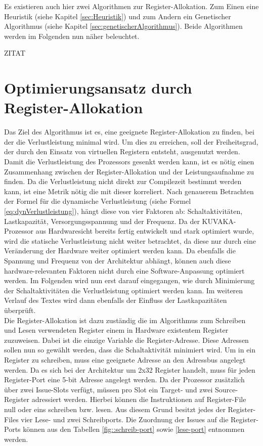 \begin{itemize}
		Es existieren auch hier zwei Algorithmen zur Register-Allokation. Zum Einen eine Heuristik (siehe Kapitel \ref{sec:Heuristik}) und zum Andern ein Genetischer Algorithmus (siehe Kapitel \ref{sec:genetischerAlgorithmus}). Beide Algorithmen werden im Folgenden nun näher beleuchtet.
\end{itemize} ZITAT


\section{Optimierungsansatz durch Register-Allokation}
\label{chap:ansatz}
Das Ziel des Algorithmus ist es, eine geeignete Register-Allokation zu finden, bei der die Verlustleistung minimal wird. Um dies zu erreichen, soll der Freiheitsgrad, der durch den Einsatz von virtuellen Registern entsteht, ausgenutzt werden.
Damit die Verlustleistung des Prozessors gesenkt werden kann, ist es nötig einen Zusammenhang zwischen der Register-Allokation und der Leistungsaufnahme zu finden. Da die Verlustleistung nicht direkt zur Compilezeit bestimmt werden kann, ist eine Metrik nötig die mit dieser korreliert.
Nach genauerem Betrachten der Formel für die dynamische Verlustleistung (siehe Formel \ref{eq:dynVerlustleistung}), hängt diese von vier Faktoren ab: Schaltaktivitäten,  Lastkapazität, Versorgungsspannung und der Frequenz. Da der KUVAKA-Prozessor aus Hardwaresicht bereits fertig entwickelt und stark optimiert wurde, wird die statische Verlustleistung nicht weiter betrachtet, da diese  nur durch eine Veränderung der Hardware weiter optimiert werden kann. Da ebenfalls  die Spannung und Frequenz von der Architektur abhängt, können auch diese hardware-relevanten Faktoren nicht durch eine Software-Anpassung optimiert werden. Im Folgenden wird nun erst darauf eingegangen, wie durch Minimierung der Schaltaktivitäten die Verlustleistung optimiert werden kann. Im weiteren Verlauf des Textes wird dann ebenfalls der Einfluss der Lastkapazitäten überprüft.\\
Die Register-Allokation ist dazu zuständig die im Algorithmus zum Schreiben und Lesen verwendeten Register einem in Hardware existentem Register zuzuweisen. Dabei ist die einzige Variable die Register-Adresse. Diese Adressen sollen nun so gewählt werden, dass die Schaltaktivität minimiert wird.
Um in ein Register zu schreiben, muss eine geeignete Adresse an den Adressbus angelegt werden. Da es sich bei der Architektur um 2x32 Register handelt, muss für jeden Register-Port eine 5-bit Adresse angelegt werden.
Da der Prozessor zusätzlich über zwei Issue-Slots verfügt, müssen pro Slot ein Target- und zwei Source-Register adressiert werden. Hierbei können die Instruktionen auf Register-File null oder eins schreiben bzw. lesen. Aus diesem Grund besitzt jedes der Register-Files vier Lese- und zwei Schreibports. Die Zuordnung der Issues auf die Register-Ports können aus den Tabellen \ref{fig::schreib-port} sowie \ref{lese-port} entnommen werden.\\
